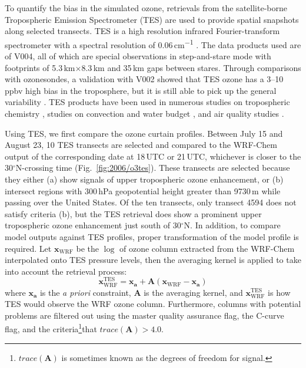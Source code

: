 To quantify the bias in the simulated ozone, retrievals from the satellite-borne Tropospheric Emission Spectrometer (TES) are used
to provide spatial snapshots along selected transects. TES is a high resolution infrared Fourier-transform spectrometer with a spectral
resolution of 0.06\,\unit{cm^{-1}} \citep{Beer:2006fk}. The data products used are of V004, all of which are special observations in
step-and-stare mode with footprints of 5.3\,\unit{km}$\times$8.3\,\unit{km} and 35\,\unit{km} gaps between stares. Through comparisons
with ozonesondes, a validation with V002 showed that TES ozone has a 3--10\,\unit{ppbv} high bias in the troposphere, but it is still
able to pick up the general variability \citep{Nassar:2008mw}. TES products have been used in numerous studies on tropospheric
chemistry \citep[e.g.][]{Hegarty:2010vn,Voulgarakis:2011fk}, studies on convection and water budget \citep[e.g.][]{Brown:2008zr,Risi:2010ys},
and air quality studies \citep[e.g.][]{Mcmillan:2010kx, Wang:2011uq}.

Using TES, we first compare the ozone curtain profiles. Between July 15 and August 23, 10 TES transects are selected and compared to
the WRF-Chem output of the corresponding date at 18\,UTC or 21\,UTC, whichever is closer to the 30$^\circ$N-crossing time (Fig.~\ref{fig:2006/o3tes}).
These transects are selected because they either (a) show signals of upper tropospheric ozone enhancement, or (b) intersect regions
with 300\,\unit{hPa} geopotential height greater than 9730\,\unit{m} while passing over the United States. Of the ten transects, only transect 4594
does not satisfy criteria (b), but the TES retrieval does show a prominent upper tropospheric ozone enhancement just south of 30$^\circ$N. In
addition, to compare model outputs against TES profiles, proper transformation of the model profile is required. Let $\mathbf{x}_{\mathrm{WRF}}$
be the $\log$ of ozone column extracted from the WRF-Chem interpolated onto TES pressure levels, then the averaging kernel is applied to take
into account the retrieval process:
	\begin{equation}\label{eqn:TES-AK}
		\mathbf{x}_{\mathrm{WRF}}^{\mathrm{TES}} = \mathbf{x_a} + \mathbf{A}\left(\mathbf{x}_{\mathrm{WRF}}-\mathbf{x_a}\right)
	\end{equation}
where $\mathbf{x_a}$ is the {\it a priori} constraint, $\mathbf{A}$ is the averaging kernel, and $\mathbf{x}_{\mathrm{WRF}}^{\mathrm{TES}}$
is how TES would observe the WRF ozone column. Furthermore, columns with potential problems are filtered out using the master quality
assurance flag, the C-curve flag, and the criteria\footnote{$trace(\mathbf{A})$ is sometimes known as the degrees of freedom for signal.}that
$trace(\mathbf{A})>4.0$.

